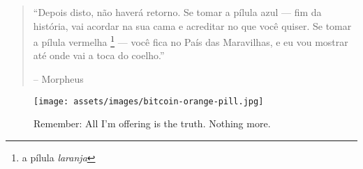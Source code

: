 \begin{quotation}\begin{samepage}
\enquote{Depois disto, não haverá retorno. Se tomar a pílula azul --- fim da história, vai acordar na sua cama e acreditar no que você quiser.  Se tomar a pílula vermelha \footnote{a pílula \textit{laranja}} --- você fica no País das Maravilhas, e eu vou mostrar até onde vai a toca do coelho.}
\begin{flushright} -- Morpheus
\end{flushright}\end{samepage}\end{quotation}

\begin{figure}
  \texttt{[image: assets/images/bitcoin-orange-pill.jpg]}
  \caption*{Remember: All I'm offering is the truth. Nothing more.}
  \label{fig:bitcoin-orange-pill}
\end{figure}

%
%
%
